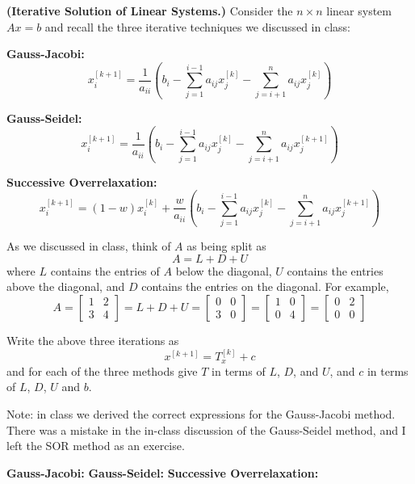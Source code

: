 \textbf{(Iterative Solution of Linear Systems.)} Consider the $n \times n$
linear system $Ax=b$ and recall the three iterative techniques we
discussed in class:

\textbf{Gauss-Jacobi:}
\[
x_i^{[k+1]} = \frac{1}{a_{ii}} \left( b_i - \sum_{j=1}^{i-1} a_{ij}
x_j^{[k]} - \sum_{j=i+1}^n a_{ij} x_j^{[k]} \right)
\]

\textbf{Gauss-Seidel:}
\[
x_i^{[k+1]} = \frac{1}{a_{ii}} \left(
b_i - \sum_{j=1}^{i-1} a_{ij} x_j^{[k]} - \sum_{j=i+1}^n a_{ij} x_j^{[k+1]}
\right)
\]

\textbf{Successive Overrelaxation:}
\[
x_i^{[k+1]} =
(1 - w)x_i^{[k]} + \frac{w}{a_{ii}}
\left(
b_i - \sum_{j=1}^{i-1} a_{ij} x_j^{[k]} - \sum_{j=i+1}^n a_{ij} x_j^{[k+1]}
\right)
\]

As we discussed in class, think of $A$ as being split as
\[
A = L + D + U
\]
where $L$ contains the entries of $A$ below the diagonal, $U$ contains
the entries above the diagonal, and $D$ contains the entries on the
diagonal. For example,
\[
A
= \left[\begin{matrix} 1 & 2 \\ 3 & 4 \end{matrix} \right]
= L + D + U
= \left[\begin{matrix} 0 & 0 \\ 3 & 0 \end{matrix} \right]
= \left[\begin{matrix} 1 & 0 \\ 0 & 4 \end{matrix} \right]
= \left[\begin{matrix} 0 & 2 \\ 0 & 0 \end{matrix} \right]
\]

Write the above three iterations as
\[
x^{[k+1]} = T_x^{[k]} + c
\]
and for each of the three methods give $T$ in terms of $L$, $D$, and
$U$, and $c$ in terms of $L$, $D$, $U$ and $b$.

Note: in class we derived the correct expressions for the Gauss-Jacobi
method. There was a mistake in the in-class discussion of the
Gauss-Seidel method, and I left the SOR method as an exercise.

{\color{blue}

\textbf{Gauss-Jacobi:}
\textbf{Gauss-Seidel:}
\textbf{Successive Overrelaxation:}
}
